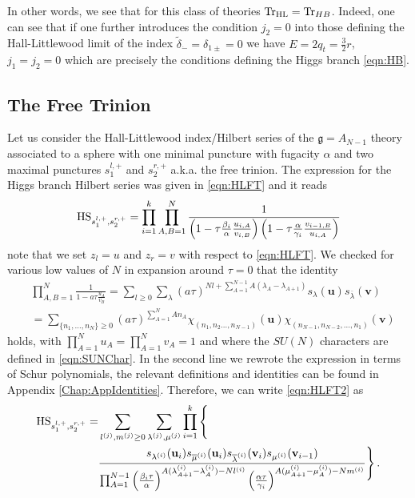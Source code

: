 \documentclass[main.tex]{subfiles}
\begin{document}
In other words, we see that for this class of theories $\operatorname{Tr}_{\textrm{HL}}=\operatorname{Tr}_{HB}$. Indeed, one can see that if one further introduces the condition $j_2=0$ into those defining the Hall-Littlewood limit of the index $\widetilde{\delta}_{\dot-}=\delta_{1\pm}=0$ we have $E=2q_t=\frac{3}{2}r$, $j_1=j_2=0$ which are precisely the conditions defining the Higgs branch \eqref{eqn:HB}.
\subsection{The Free Trinion}
Let us consider the Hall-Littlewood index/Hilbert series of the $\mathfrak{g}=A_{N-1}$ theory associated to a sphere with one minimal puncture with fugacity $\alpha$ and two maximal punctures $s_1^{l,+}$ and $s_2^{r,+}$ a.k.a. the free trinion. The expression for the Higgs branch Hilbert series was given in \eqref{eqn:HLFT} and it reads
\begin{equation}\label{eqn:HLFT2}
\textrm{HS}_{s_{1}^{l,+},s_{2}^{r,+}}=\prod_{i=1}^k\prod_{A,B=1}^N\frac{1}{\left(1-\tau\frac{\beta_{i}}{\alpha}\frac{u_{i,A}}{v_{i,B}}\right)\left(1-\tau\frac{\alpha}{\gamma_i}\frac{v_{i-1,B}}{u_{i,A}}\right)}
\end{equation}
note that we set $z_l=u$ and $z_r=v$ with respect to \eqref{eqn:HLFT}.
We checked for various low values of $N$ in expansion around $\tau=0$ that the identity
\begin{equation}
\begin{aligned}
&\prod_{A,B=1}^N\frac{1}{1-a\tau \frac{u_A}{v_B}}=\sum_{l\geq0}\sum_{\lambda}(a\tau)^{Nl+\sum_{A=1}^{N-1}A(\lambda_A-\lambda_{A+1})}s_{\lambda}(\mathbf{u})s_{\overline{\lambda}}(\mathbf{v})\\
&=\sum_{\{n_1,\dots,n_N\}\geq0}(a\tau)^{\sum_{A=1}^NAn_A}\chi_{(n_1,n_2\dots,n_{N-1})}(\mathbf{u})\chi_{(n_{N-1},n_{N-2},\dots,n_1)}(\mathbf{v})
\end{aligned}
\end{equation}
holds, with $\prod_{A=1}^Nu_A=\prod_{A=1}^Nv_A=1$ and where the $SU(N)$ characters are defined in \eqref{eqn:SUNChar}. In the second line we rewrote the expression in terms of Schur polynomials, the relevant definitions and identities can be found in Appendix \ref{Chap:AppIdentities}. Therefore, we can write \eqref{eqn:HLFT2} as
\begin{equation}
\begin{aligned}
\textrm{HS}_{s_{1}^{l,+},s_{2}^{r,+}}=&\sum_{l^{(j)},m^{(j)}\geq0}\sum_{\lambda^{(j)},\mu^{(j)}}\prod_{i=1}^k\Bigg\{\\
&\frac{s_{\lambda^{(i)}}(\mathbf{u}_i)s_{\overline{\mu}^{(i)}}(\mathbf{u}_i)s_{\overline{\lambda}^{(i)}}(\mathbf{v}_i)s_{\mu^{(i)}}(\mathbf{v}_{i-1})}{\prod_{A=1}^{N-1}\left(\frac{\beta_i\tau}{\alpha}\right)^{A(\lambda_{A+1}^{(i)}-\lambda_A^{(i)})-Nl^{(i)}}\left(\frac{\alpha\tau}{\gamma_i}\right)^{A(\mu_{A+1}^{(i)}-\mu_A^{(i)})-Nm^{(i)}}}\Bigg\}\,.
\end{aligned}
\end{equation}
\end{document}
